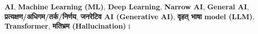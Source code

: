 \begin{mukhyashabd}
\textbf{AI}, \textbf{Machine Learning (ML)}, \textbf{Deep Learning},
\textbf{Narrow AI}, \textbf{General AI},
\textbf{प्रत्यक्षण/अधिगम/तर्क/निर्णय}, \textbf{जनरेटिव AI (Generative AI)},
\textbf{वृहत् भाषा model (LLM)}, \textbf{Transformer}, \textbf{मतिभ्रम (Hallucination)}।
\end{mukhyashabd}
